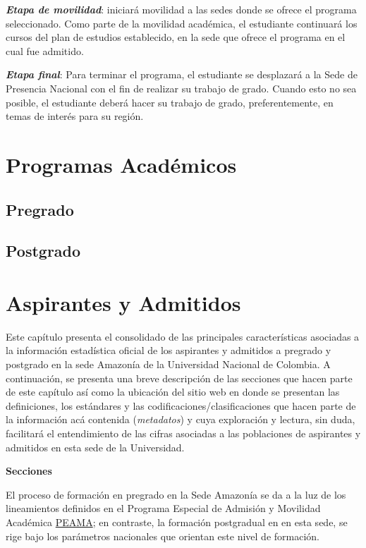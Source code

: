 \documentclass[
]{book}
\begin{document}
\emph{\textbf{Etapa de movilidad}}: iniciará movilidad a las sedes donde se ofrece el programa seleccionado. Como parte de la movilidad académica, el estudiante continuará los cursos del plan de estudios establecido, en la sede que ofrece el programa en el cual fue admitido.

\emph{\textbf{Etapa final}}: Para terminar el programa, el estudiante se desplazará a la Sede de Presencia Nacional con el fin de realizar su trabajo de grado. Cuando esto no sea posible, el estudiante deberá hacer su trabajo de grado, preferentemente, en temas de interés para su región.

\hypertarget{Prog}{%
\chapter{Programas Académicos}\label{Prog}}

\hypertarget{pregrado}{%
\section{Pregrado}\label{pregrado}}

\hypertarget{postgrado}{%
\section{Postgrado}\label{postgrado}}

\hypertarget{Aspirantes}{%
\chapter{Aspirantes y Admitidos}\label{Aspirantes}}

Este capítulo presenta el consolidado de las principales características asociadas a la información estadística oficial de los aspirantes y admitidos a pregrado y postgrado en la sede Amazonía de la Universidad Nacional de Colombia. A continuación, se presenta una breve descripción de las secciones que hacen parte de este capítulo así como la ubicación del sitio web en donde se presentan las definiciones, los estándares y las codificaciones/clasificaciones que hacen parte de la información acá contenida (\emph{metadatos}) y cuya exploración y lectura, sin duda, facilitará el entendimiento de las cifras asociadas a las poblaciones de aspirantes y admitidos en esta sede de la Universidad.

\textbf{Secciones}

El proceso de formación en pregrado en la Sede Amazonía se da a la luz de los lineamientos definidos en el Programa Especial de Admisión y Movilidad Académica \protect\hyperlink{peama}{PEAMA}; en contraste, la formación postgradual en en esta sede, se rige bajo los parámetros nacionales que orientan este nivel de formación.
\end{document}
